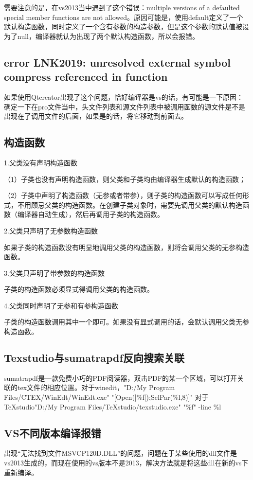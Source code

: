 需要注意的是，在vs2013当中遇到了这个错误：multiple versions of a defaulted special member functions are not allowed。原因可能是，使用default定义了一个默认构造函数，同时定义了一个含有参数的构造参数，但是这个参数的默认值被设为了null，编译器就认为出现了两个默认构造函数，所以会报错。

\subsection{error LNK2019: unresolved external symbol compress referenced in function}
如果使用Qtcreator出现了这个问题，恰好编译器是vs的话，有可能是一下原因：确定一下在pro文件当中，头文件列表和源文件列表中被调用函数的源文件是不是出现在了调用文件的后面，如果是的话，将它移动到前面去。

\subsection{构造函数}
1.父类没有声明构造函数

（1）子类也没有声明构造函数，则父类和子类均由编译器生成默认的构造函数；

（2）子类中声明了构造函数（无参或者带参），则子类的构造函数可以写成任何形式，不用顾忌父类的构造函数。在创建子类对象时，需要先调用父类的默认构造函数（编译器自动生成），然后再调用子类的构造函数。

2.父类只声明了无参数构造函数

如果子类的构造函数没有明显地调用父类的构造函数，则将会调用父类的无参构造函数。

3.父类只声明了带参数的构造函数

子类的构造函数必须显式得调用父类的构造函数。

4.父类同时声明了无参和有参构造函数

子类的构造函数调用其中一个即可。如果没有显式调用的话，会默认调用父类无参构造函数。

\subsection{Texstudio与sumatrapdf反向搜索关联}

sumatrapdf是一款免费小巧的PDF阅读器，双击PDF的某一个区域，可以打开关联的tex文件的相应位置。对于winedit，"D:/My Program Files/CTEX/WinEdt/WinEdt.exe" "[Open(|\%f|);SelPar(\%l,8)]"
对于TeXstudio"D:/My Program Files/TeXstudio/texstudio.exe"  "\%f" -line \%l

\subsection{VS不同版本编译报错}
出现“无法找到文件MSVCP120D.DLL”的问题，问题在于某些使用的dll文件是vs2013生成的，而现在使用的vs版本不是2013，解决方法就是将这些dll在新的vs下重新编译。

